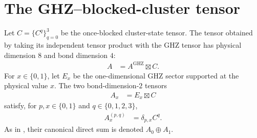 \section{The GHZ--blocked-cluster tensor}
\label{sec:mpug_ghz_blocked_cluster}

\begin{definition}
    \label{def:mpug_ghz_blocked_cluster_tensor}
    \leanok
    Let $C=\{C^q\}_{q=0}^3$ be the once-blocked cluster-state tensor. The tensor
    obtained by taking its independent tensor product with the GHZ tensor has
    physical dimension $8$ and bond dimension $4$:
    \begin{align}
        A & =A^{\mathrm{GHZ}}\boxtimes C.
        \label{eq:mpug_ghz_blocked_cluster_tensor}
    \end{align}
    For $x\in\{0,1\}$, let $E_x$ be the one-dimensional GHZ sector supported
    at the physical value $x$. The two bond-dimension-$2$ tensors
    \begin{align}
        A_x & =E_x\boxtimes C
    \end{align}
    satisfy, for $p,x\in\{0,1\}$ and $q\in\{0,1,2,3\}$,
    \begin{align}
        A_x^{(p,q)} & =\delta_{p,x}C^q.
        \label{eq:mpug_ghz_blocked_cluster_blocks}
    \end{align}
    As in \cite[lines~4427--4479]{FrancoRubio2025MPUGauging}, their canonical
    direct sum is denoted $A_0\oplus A_1$.
\end{definition}

